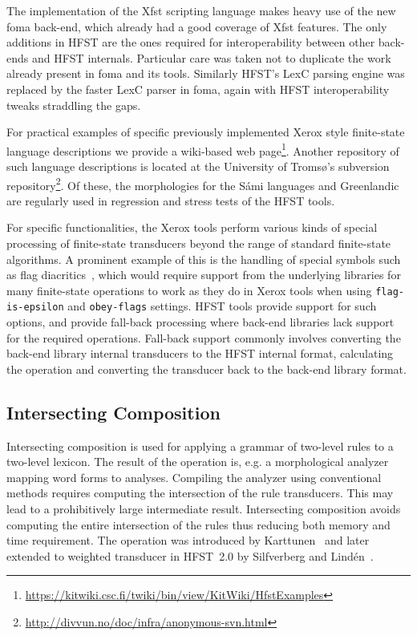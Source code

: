 \documentclass{llncs}
\begin{document}
The implementation of the Xfst scripting language makes heavy
use of the new foma back-end, which already had a good coverage of Xfst
features. The only additions in HFST are the ones required for
interoperability between other back-ends and HFST internals. Particular
care was taken not to duplicate the work already present in foma and its
tools. Similarly HFST's LexC parsing engine was
replaced by the faster LexC parser in foma, again with HFST interoperability
tweaks straddling the gaps.

For practical examples of specific previously implemented Xerox style finite-state
language descriptions we provide a wiki-based web page\footnote{\url{https://kitwiki.csc.fi/twiki/bin/view/KitWiki/HfstExamples}}. Another repository of
such language descriptions is located at the University of Tromsø's subversion
repository\footnote{\url{http://divvun.no/doc/infra/anonymous-svn.html}}.
Of these, the morphologies for the Sámi languages and Greenlandic are 
regularly used in regression and stress tests of the HFST tools.

For specific functionalities, the Xerox tools perform various kinds of special
processing of finite-state transducers beyond the range of standard finite-state
algorithms. A prominent example of this is the handling of special symbols such
as flag diacritics~\cite{beesley/1998}, which would require support from
the underlying libraries for many finite-state operations to work as they do in
Xerox tools when using \texttt{flag-is-epsilon} and \texttt{obey-flags}
settings. HFST tools provide support for such options, and provide
fall-back processing where back-end libraries lack support for the
required operations. Fall-back support commonly involves converting the
back-end library internal transducers to the HFST internal format, calculating the operation
and converting the transducer back to the back-end library format. 

\subsection{Intersecting Composition}
Intersecting composition is used for applying a grammar of two-level
rules to a two-level lexicon. The result of the operation
is, e.g. a morphological analyzer mapping word forms to
analyses. Compiling the analyzer using conventional methods requires
computing the intersection of the rule transducers. This may lead to a
prohibitively large intermediate result. Intersecting composition
avoids computing the entire intersection of the rules thus reducing
both memory and time requirement. The operation was introduced by
Karttunen~\cite{Karttunen/1994} and later extended to weighted
transducer in HFST~2.0 by Silfverberg and Lind\'{e}n~\cite{silfverberg/2009/2}.
\end{document}
